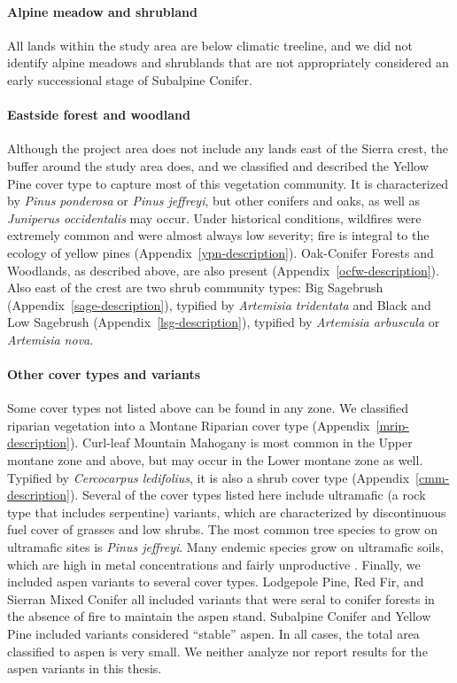 \paragraph{Alpine meadow and shrubland} All lands within the study area are below climatic treeline, and we did not identify alpine meadows and shrublands that are not appropriately considered an early successional stage of Subalpine Conifer.


\paragraph{Eastside forest and woodland} Although the project area does not include any lands east of the Sierra crest, the buffer around the study area does, and we classified and described the Yellow Pine cover type to capture most of this vegetation community. It is characterized by \emph{Pinus ponderosa} or \emph{Pinus jeffreyi}, but other conifers and oaks, as well as \emph{Juniperus occidentalis} may occur. Under historical conditions, wildfires were extremely common and were almost always low severity; fire is integral to the ecology of yellow pines (Appendix~\ref{ypn-description}). 
%
Oak-Conifer Forests and Woodlands, as described above, are also present (Appendix~\ref{ocfw-description}). 
%
Also east of the crest are two shrub community types: Big Sagebrush (Appendix~\ref{sage-description}), typified by \emph{Artemisia tridentata} and Black and Low Sagebrush (Appendix~\ref{lsg-description}), typified by \emph{Artemisia arbuscula} or \emph{Artemisia nova}. 


\paragraph{Other cover types and variants} Some cover types not listed above can be found in any zone. We classified riparian vegetation into a Montane Riparian cover type (Appendix~\ref{mrip-description}). 
%
Curl-leaf Mountain Mahogany is most common in the Upper montane zone and above, but may occur in the Lower montane zone as well. Typified by \emph{Cercocarpus ledifolius}, it is also a shrub cover type (Appendix~\ref{cmm-description}). 
%
Several of the cover types listed here include ultramafic (a rock type that includes serpentine) variants, which are characterized by discontinuous fuel cover of grasses and low shrubs. The most common tree species to grow on ultramafic sites is \emph{Pinus jeffreyi}. Many endemic species grow on ultramafic soils, which are high in metal concentrations and fairly unproductive \citep{OGeen2007}.
%
Finally, we included aspen variants to several cover types. Lodgepole Pine, Red Fir, and Sierran Mixed Conifer all included variants that were seral to conifer forests in the absence of fire to maintain the aspen stand. Subalpine Conifer and Yellow Pine included variants considered ``stable'' aspen. In all cases, the total area classified to aspen is very small. We neither analyze nor report results for the aspen variants in this thesis.





